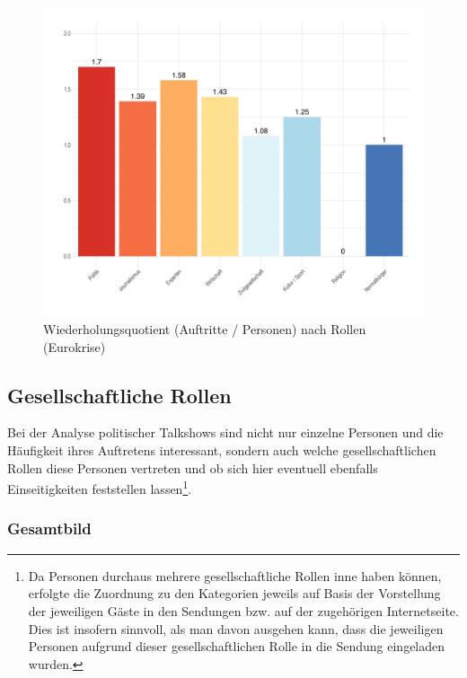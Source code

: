 \begin{figure}[ht]
	\centering
	\includegraphics[width=1\textwidth]{daten/grafiken/plot_wdhquote_gaeste_euro.png}
	\caption{Wiederholungsquotient (Auftritte / Personen) nach Rollen (Eurokrise)}
	\label{plot:whdquote_gaeste_euro}
\end{figure}

\subsection{Gesellschaftliche Rollen}\label{chap:gesellschaftlicherollen}

Bei der Analyse politischer Talkshows sind nicht nur einzelne Personen und die Häufigkeit ihres Auftretens interessant, sondern auch welche gesellschaftlichen Rollen diese Personen vertreten und ob sich hier eventuell ebenfalls Einseitigkeiten feststellen lassen\footnote{Da Personen durchaus mehrere gesellschaftliche Rollen inne haben können, erfolgte die Zuordnung zu den Kategorien jeweils auf Basis der Vorstellung der jeweiligen Gäste in den Sendungen bzw. auf der zugehörigen Internetseite. Dies ist insofern sinnvoll, als man davon ausgehen kann, dass die jeweiligen Personen aufgrund dieser gesellschaftlichen Rolle in die Sendung eingeladen wurden.}.

\subsubsection{Gesamtbild}


